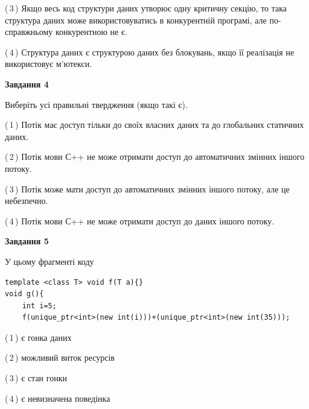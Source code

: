\documentclass[12pt, ukrainian]{article}
\begin{document}
\begin {large}
{(\,3\,) Якщо весь код структури даних утворює одну критичну секцію, то така структура даних може використовуватись в конкурентній програмі, але по-справжньо\-му конкурентною не є.%

(\,4\,) Структура даних є структурою даних без блокувань, якщо її реалізація не використовує м’ютекси.%



\begin{center}
\textbf{Завдання 4}
\end{center}
Виберіть усі правильні твердження (якщо такі є).\par
\vspace{2mm}

(\,1\,) Потік має доступ тільки до своїх власних даних та до глобальних статичних даних.%

(\,2\,) Потік мови С++ не може отримати доступ до автоматичних змінних іншого потоку.%

(\,3\,) Потік може мати доступ до автоматичних змінних іншого потоку, але це небезпечно.%

(\,4\,) Потік мови С++ не може отримати доступ до даних іншого потоку.%



\begin{center}
\textbf{Завдання 5}
\end{center}
У цьому фрагменті коду
\begin{verbatim}
template <class T> void f(T a){}
void g(){
    int i=5;
    f(unique_ptr<int>(new int(i)))+(unique_ptr<int>(new int(35)));
\end{verbatim}
(\,1\,) є гонка даних%

(\,2\,) можливий виток ресурсів%

(\,3\,) є стан гонки%

(\,4\,) є невизначена поведінка%


}
\end {large}
\end{document}

